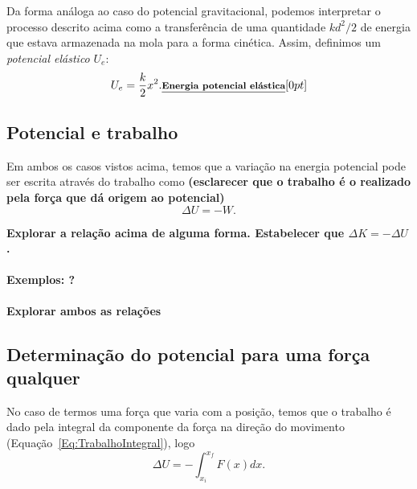Da forma análoga ao caso do potencial gravitacional, podemos interpretar o processo descrito acima como a transferência de uma quantidade $kd^2/2$ de energia que estava armazenada na mola para a forma cinética. Assim, definimos um \emph{potencial elástico} $U_e$:
\begin{equation}
  U_e = \frac{k}{2}x^2. \relax{\footnotesize\emph{\textbf{Energia potencial elástica}}}[0pt]
\end{equation}

\subsection{Potencial e trabalho}

Em ambos os casos vistos acima, temos que a variação na energia potencial pode ser escrita através do trabalho como \textbf{(esclarecer que o trabalho é o realizado pela força que dá origem ao potencial)}
\begin{equation}
  \Delta U = - W.
\end{equation}

\textbf{Explorar a relação acima de alguma forma. Estabelecer que $\Delta K = - \Delta U$.}

\paragraph{Exemplos: ?}

\textbf{Explorar ambos as relações}

\subsection{Determinação do potencial para uma força qualquer}

No caso de termos uma força que varia com a posição, temos que o trabalho é dado pela integral da componente da força na direção do movimento (Equação~\eqref{Eq:TrabalhoIntegral}), logo
\begin{equation}\label{Eq:CalculoDoPotencial}
  \Delta U = - \int_{x_i}^{x_f} F(x) dx.
\end{equation}

